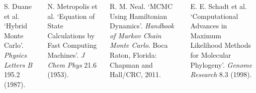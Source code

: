 \documentclass{tikzposter}
\begin{document}
\begin{columns}
{            \hangindent=50pt S. Duane et al. `Hybrid Monte Carlo'. \emph{Physics Letters B} 195.2 (1987).

            \hangindent=50pt N. Metropolis et al. `Equation of State Calculations by Fast Computing Machines'. \emph{J Chem Phys} 21.6 (1953).

            \hangindent=50pt R. M. Neal. `MCMC Using Hamiltonian Dynamics'. \emph{Handbook of Markov Chain Monte Carlo}. Boca Raton, Florida: Chapman and Hall/CRC, 2011.

            \hangindent=50pt E. E. Schadt et al. `Computational Advances in Maximum Likelihood Methods for Molecular Phylogeny'. \emph{Genome Research} 8.3 (1998).
        }

    \end{columns}
\end{document}
